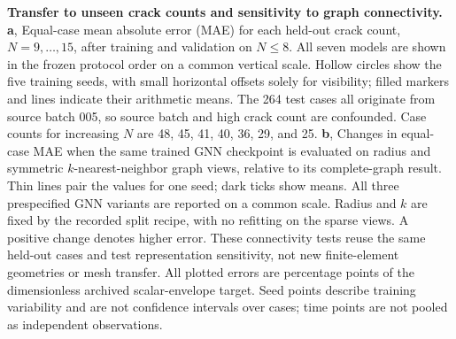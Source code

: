 \textbf{Transfer to unseen crack counts and sensitivity to graph connectivity.}
\textbf{a}, Equal-case mean absolute error (MAE) for each held-out crack count, $N=9,\ldots,15$, after training and validation on $N\leq8$. All seven models are shown in the frozen protocol order on a common vertical scale. Hollow circles show the five training seeds, with small horizontal offsets solely for visibility; filled markers and lines indicate their arithmetic means. The 264 test cases all originate from source batch 005, so source batch and high crack count are confounded. Case counts for increasing $N$ are 48, 45, 41, 40, 36, 29, and 25.
\textbf{b}, Changes in equal-case MAE when the same trained GNN checkpoint is evaluated on radius and symmetric $k$-nearest-neighbor graph views, relative to its complete-graph result. Thin lines pair the values for one seed; dark ticks show means. All three prespecified GNN variants are reported on a common scale. Radius and $k$ are fixed by the recorded split recipe, with no refitting on the sparse views. A positive change denotes higher error. These connectivity tests reuse the same held-out cases and test representation sensitivity, not new finite-element geometries or mesh transfer.
All plotted errors are percentage points of the dimensionless archived scalar-envelope target. Seed points describe training variability and are not confidence intervals over cases; time points are not pooled as independent observations.
